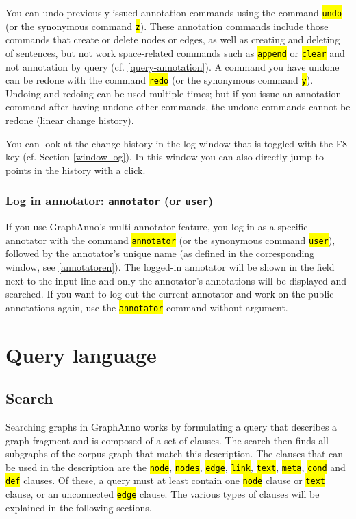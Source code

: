 \documentclass[12pt]{scrartcl}
\newcommand{\code}[1]{\hl{\texttt{#1}}}
\begin{document}
You can undo previously issued annotation commands using the command \code{undo} (or the synonymous command \code{z}).
These annotation commands include those commands that create or delete nodes or edges, as well as creating and deleting of sentences, but not work space-related commands such as \code{append} or \code{clear} and not annotation by query (cf. \ref{query-annotation}).
A command you have undone can be redone with the command \code{redo} (or the synonymous command \code{y}).
Undoing and redoing can be used multiple times; but if you issue an annotation command after having undone other commands, the undone commands cannot be redone (linear change history).

You can look at the change history in the log window that is toggled with the F8 key (cf. Section \ref{window-log}).
In this window you can also directly jump to points in the history with a click.


\subsubsection{Log in annotator: \texttt{annotator} (or \texttt{user})}

If you use GraphAnno’s multi-annotator feature, you log in as a specific annotator with the command \code{annotator} (or the synonymous command \code{user}), followed by the annotator’s unique name (as defined in the corresponding window, see \ref{annotatoren}).
The logged-in annotator will be shown in the field next to the input line and only the annotator’s annotations will be displayed and searched.
If you want to log out the current annotator and work on the public annotations again, use the \code{annotator} command without argument.



\section{Query language}\label{querylanguage}

\subsection{Search}

Searching graphs in GraphAnno works by formulating a query that describes a graph fragment and is composed of a set of clauses.
The search then finds all subgraphs of the corpus graph that match this description.
The clauses that can be used in the description are the \code{node}, \code{nodes}, \code{edge}, \code{link}, \code{text}, \code{meta}, \code{cond} and \code{def} clauses.
Of these, a query must at least contain one \code{node} clause or \code{text} clause, or an unconnected \code{edge} clause.
The various types of clauses will be explained in the following sections.
\end{document}
